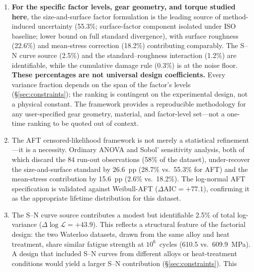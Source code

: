\documentclass[twocolumn,12pt,a4paper]{article}
\begin{document}
\begin{enumerate}
  \item \textbf{For the specific factor levels, gear geometry, and
        torque studied here}, the size-and-surface factor formulation
        is the leading source of method-induced uncertainty (55.3\%; %
        surface-factor component isolated under ISO baseline; lower
        bound on full standard divergence), with surface roughness
        (22.6\%) and mean-stress correction (18.2\%) contributing %
        comparably. The S--N curve source (2.5\%) and the %
        standard--roughness interaction (1.2\%) are identifiable, while %
        the cumulative damage rule (0.3\%) is at the noise floor. %
        \textbf{These
        percentages are not universal design coefficients.} Every
        variance fraction depends on the span of the factor's levels
        (\S\ref{sec:constraints}); the ranking is contingent on the
        experimental design, not a physical constant. The framework provides a reproducible methodology
        for any user-specified gear geometry, material, and factor-level
        set---not a one-time ranking to be quoted out of context.
  \item The AFT censored-likelihood framework is not merely a statistical
        refinement---it is a necessity. Ordinary ANOVA and Sobol' sensitivity
        analysis, both of which discard the 84 run-out observations
        (58\% of the dataset), under-recover the size-and-surface standard
        by 26.6~pp (28.7\% vs.\ 55.3\% for AFT) and the mean-stress
        contribution by 15.6~pp (2.6\% vs.\ 18.2\%). The log-normal AFT specification is validated against
        Weibull-AFT ($\Delta\mathrm{AIC} = +77.1$), confirming it as the
        appropriate lifetime distribution for this dataset.
  \item The S--N curve source contributes a modest but identifiable
        2.5\% of total log-variance ($\Delta\log\mathcal{L} = +43.9$).
        This reflects a structural feature of the factorial design: the
        two Waterloo datasets, drawn from the same alloy and heat
        treatment, share similar fatigue strength at $10^6$~cycles
        (610.5 vs.\ 609.9~MPa). A design that included S--N curves from
        different alloys or heat-treatment conditions would yield a
        larger S--N contribution (\S\ref{sec:constraints}). This

\end{enumerate}
\end{document}
